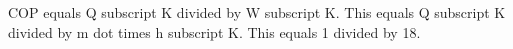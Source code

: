 COP equals Q subscript K divided by W subscript K.  
This equals Q subscript K divided by m dot times h subscript K.  
This equals 1 divided by 18.